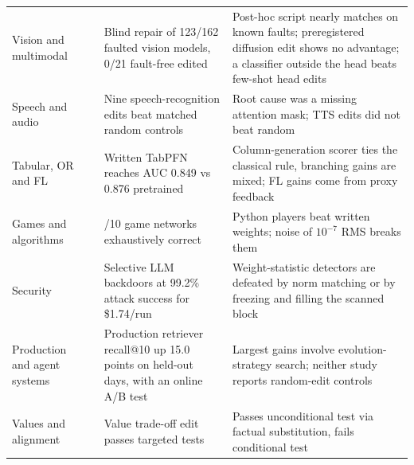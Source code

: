 \begin{table}[p]
\begin{tabularx}{\linewidth}{>{\raggedright\arraybackslash}p{2.4cm} >{\raggedright\arraybackslash}p{3.1cm} >{\raggedright\arraybackslash}X >{\raggedright\arraybackslash}X}
Vision and multimodal & \citep{ax2611_23615,ax2611_28781,ax2611_25476,ax2611_26408,ax2611_31233,ax2611_29882,ax2611_22228,ax2611_17789,ax2611_25257,ax2611_28105,ax2611_33031,zen24168084} & Blind repair of 123/162 faulted vision models, 0/21 fault-free edited \citep{ax2611_28781} & Post-hoc script nearly matches on known faults; preregistered diffusion edit shows no advantage; a classifier outside the head beats few-shot head edits \citep{ax2611_28781,ax2611_22228,ax2611_28105} \\
Speech and audio & \citep{zen23976684,ax2611_29455} & Nine speech-recognition edits beat matched random controls \citep{zen23976684} & Root cause was a missing attention mask; TTS edits did not beat random \citep{zen23976684,ax2611_29455} \\
Tabular, OR and FL & \citep{ax2611_20174,ax2611_09559,ax2611_08383,ax2611_11005,ax2611_19292,ax2611_15917} & Written TabPFN reaches AUC 0.849 vs 0.876 pretrained \citep{ax2611_20174} & Column-generation scorer ties the classical rule, branching gains are mixed; FL gains come from proxy feedback \citep{ax2611_09559,ax2611_08383} \\
Games and algorithms & \citep{takehi2026sparks,ax2611_21449,ax2611_09271,ax2611_16981,ax2611_18114,ax2611_22055,ax2611_31979} & 6/10 game networks exhaustively correct \citep{ax2611_09271} & Python players beat written weights; noise of $10^{-7}$ RMS breaks them \citep{ax2611_16981} \\
Security & \citep{ax2611_17395,ax2611_27920,ax2611_27425,ax2611_27426,ax2611_19304,zen24156363,ax2610_07334,ax2611_15118,zen23958069} & Selective LLM backdoors at 99.2\% attack success for \$1.74/run \citep{ax2611_27920} & Weight-statistic detectors are defeated by norm matching \citep{zen24156363} or by freezing and filling the scanned block \citep{ax2611_19304} \\
Production and agent systems & \citep{ax2611_29613,ax2611_32332} & Production retriever recall@10 up 15.0 points on held-out days, with an online A/B test \citep{ax2611_29613} & Largest gains involve evolution-strategy search; neither study reports random-edit controls \citep{ax2611_29613,ax2611_32332} \\
Values and alignment & \citep{ax2611_24330} & Value trade-off edit passes targeted tests \citep{ax2611_24330} & Passes unconditional test via factual substitution, fails conditional test \citep{ax2611_24330} \\
\bottomrule
\end{tabularx}
\end{table}

